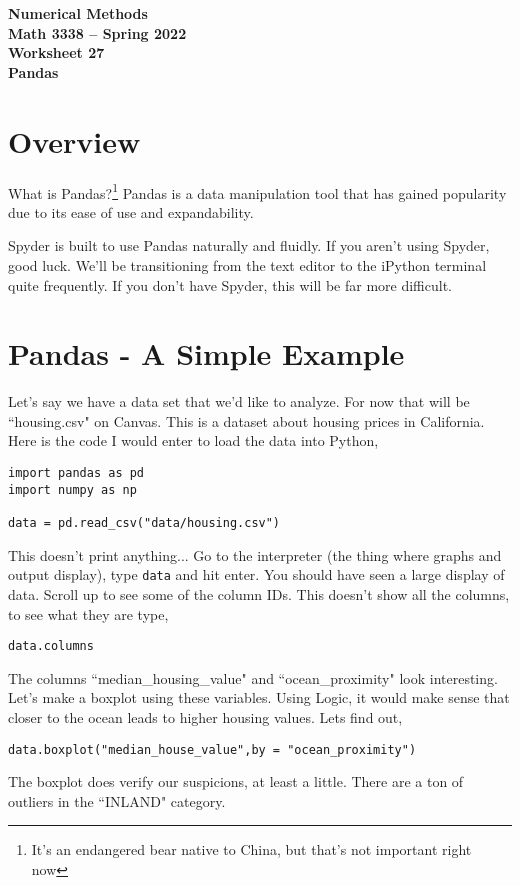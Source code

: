 \documentclass[11pt,letterpaper]{article}
\newcommand{\semester}{Spring 2022}
\begin{document}
\begin{center}
{\huge{\bf  Numerical Methods}} \\[1.5ex]
{\bf Math 3338 -- \semester}\\[1.5ex]
{\Large{\bf Worksheet 27\ \\[2ex] Pandas}}\\
\end{center}
\vspace{2mm}


\section{Overview}

What is Pandas?\footnote{It's an endangered bear native to China, but that's not important right
now} Pandas is a data manipulation tool that has gained popularity due to its ease of use and 
expandability.

Spyder is built to use Pandas naturally and fluidly. If you aren't using Spyder, good luck. We'll
be transitioning from the text editor to the iPython terminal quite frequently. If you don't have
Spyder, this will be far more difficult. 



\section{Pandas - A Simple Example}
Let's say we have a data set that we'd like to analyze. For now that will be ``housing.csv" on
Canvas. This is a dataset about housing prices in California.  Here is the code I would enter to 
load the data into Python,
\begin{verbatim}
import pandas as pd
import numpy as np

data = pd.read_csv("data/housing.csv")
\end{verbatim}
This doesn't print anything... Go to the interpreter (the thing where graphs and output display),
type \texttt{data} and hit enter. You should have seen a large display of data. Scroll up to see
some of the column IDs. This doesn't show all the columns, to see what they are type,
\begin{verbatim}
data.columns
\end{verbatim}

The columns ``median\_housing\_value" and ``ocean\_proximity" look interesting. Let's make a boxplot
using these variables. Using Logic, it would make sense that closer to the ocean leads to higher
housing values. Lets find out,
\begin{verbatim}
data.boxplot("median_house_value",by = "ocean_proximity")
\end{verbatim}
The boxplot does verify our suspicions, at least a little. There are a ton of outliers in the ``INLAND"
category.
\end{document}
